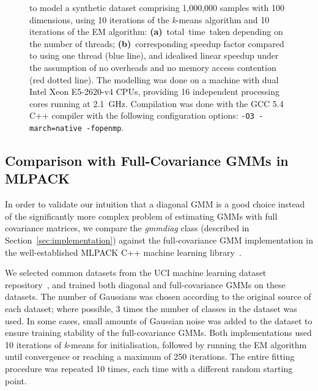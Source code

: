 \documentclass[10pt,a4paper]{article}
\def\_{{\tt\char95}}
\begin{document}
\begin{figure}[!b]
{  to model a synthetic dataset comprising 1,000,000 samples with 100 dimensions,
  using 10 iterations of the {\it k}-means algorithm and 10 iterations of the EM algorithm:
  {\bf (a)}~total~time~taken depending on the number of threads;
  {\bf (b)}~corresponding speedup factor compared to using one thread (blue line), and idealised linear speedup under the assumption of no overheads and no memory access contention (red dotted line).
  The modelling was done on a machine with dual Intel Xeon E5-2620-v4 CPUs, providing 16 independent processing cores running at 2.1~GHz.
  Compilation was done with the GCC 5.4 C++ compiler with the following configuration options: \texttt{-O3 -march=native -fopenmp}.
  }
\label{fig:speedup}
\end{figure}



\subsection{Comparison with Full-Covariance GMMs in MLPACK}

In order to validate our intuition that a diagonal GMM is a good choice instead
of the significantly more complex problem of estimating GMMs with full covariance matrices,
we compare the {\it gmm\_diag} class (described in Section~\ref{sec:implementation})
against the full-covariance GMM implementation in the well-established MLPACK C++ machine learning library~\cite{Curtin_2013}.

We selected common datasets from the UCI machine learning dataset repository~\cite{Lichman_2013},
and trained both diagonal and full-covariance GMMs on these datasets.
The number of Gaussians was chosen according to the original source of each dataset;
where possible, 3 times the number of classes in the dataset was used.
In some cases, small amounts of Gaussian noise was added to the dataset to ensure
training stability of the full-covariance GMMs.
Both implementations used 10 iterations of {\it k}-means for initialisation,
followed by running the EM algorithm until convergence or reaching a maximum of 250 iterations.
The entire fitting procedure was repeated 10 times, each time with a different random starting point.
\end{document}
